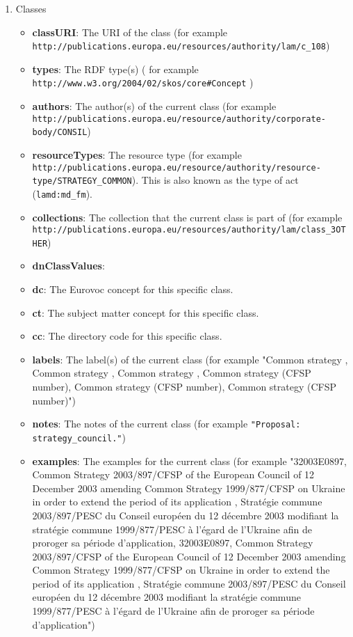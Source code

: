 \begin{enumerate}
\begin{itemize}
	\end{itemize}
	\item Classes
	\begin{itemize}
	\item \textbf{classURI}: The URI of the class (for example \lstinline!http://publications.europa.eu/resources/authority/lam/c_108!)
	\item \textbf{types}: The RDF type(s) ( for example \lstinline!http://www.w3.org/2004/02/skos/core#Concept! )
	\item \textbf{authors}: The author(s) of the current class (for example \lstinline!http://publications.europa.eu/resource/authority/corporate-body/CONSIL!)
	\item \textbf{resourceTypes}: The resource type (for example \lstinline!http://publications.europa.eu/resource/authority/resource-type/STRATEGY_COMMON!). This is also known as the type of act (\lstinline!lamd:md_fm!).
	\item \textbf{collections}: The collection that the current class is part of (for example \lstinline!http://publications.europa.eu/resources/authority/lam/class_3OTHER!)
	\item \textbf{dnClassValues}:
	\item \textbf{dc}: The Eurovoc concept for this specific class.
	\item \textbf{ct}: The subject matter concept for this specific class.
	\item \textbf{cc}: The directory code for this specific class.
	\item \textbf{labels}: The label(s) of the current class (for example "Common strategy , Common strategy , Common strategy , Common strategy (CFSP number), Common strategy (CFSP number), Common strategy (CFSP number)")
	\item \textbf{notes}: The notes of the current class (for example \lstinline!"Proposal: strategy_council."!)
	\item \textbf{examples}: The examples for the current class (for example "32003E0897, Common Strategy 2003/897/CFSP of the European Council of 12 December 2003 amending Common Strategy 1999/877/CFSP on Ukraine in order to extend the period of its application , Stratégie commune 2003/897/PESC du Conseil européen du 12 décembre 2003 modifiant la stratégie commune 1999/877/PESC à l'égard de l'Ukraine afin de proroger sa période d'application, 32003E0897, Common Strategy 2003/897/CFSP of the European Council of 12 December 2003 amending Common Strategy 1999/877/CFSP on Ukraine in order to extend the period of its application , Stratégie commune 2003/897/PESC du Conseil européen du 12 décembre 2003 modifiant la stratégie commune 1999/877/PESC à l'égard de l'Ukraine afin de proroger sa période d'application")

\end{itemize}
\end{enumerate}
